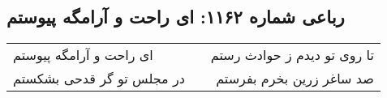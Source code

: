 \begin{center}
\section*{رباعی شماره ۱۱۶۲: ای راحت و آرامگه پیوستم}
\label{sec:1162}
\begin{longtable}{l p{0.5cm} r}
ای راحت و آرامگه پیوستم
&&
تا روی تو دیدم ز حوادث رستم
\\
در مجلس تو گر قدحی بشکستم
&&
صد ساغر زرین بخرم بفرستم
\\
\end{longtable}
\end{center}
